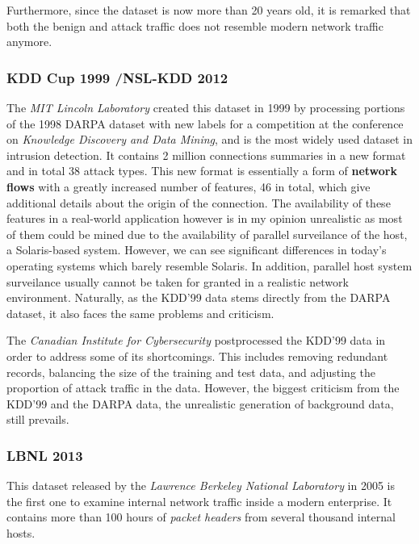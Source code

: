 \documentclass[a4paper,12pt,twoside]{report}
\begin{document}
Furthermore, since the dataset is now more than 20 years old, it is remarked that both the benign and attack traffic does not resemble modern network traffic anymore. 

\subsubsection*{KDD Cup 1999 \cite{cup1999data,cup1999dataset}/NSL-KDD 2012 \cite{tavallaee2012nsl}}

The \textit{MIT Lincoln Laboratory} created this dataset in 1999 by processing portions of the 1998 DARPA dataset with new labels for a competition at the conference on \textit{Knowledge Discovery and Data Mining}, and is the most widely used dataset in intrusion detection. It contains 2 million connections summaries in a new format and in total 38 attack types. This new format is essentially a form of \textbf{network flows} with a greatly increased number of features, 46 in total, which give additional details about the origin of the connection. The availability of these features in a real-world application however is in my opinion unrealistic as most of them could be mined due to the availability of parallel surveilance of the host, a Solaris-based system. However, we can see significant differences in today's operating systems which barely resemble Solaris. In addition, parallel host system surveilance usually cannot be taken for granted in a realistic network environment. Naturally, as the KDD'99 data stems directly from the DARPA dataset, it also faces the same problems and criticism. 

The \textit{Canadian Institute for Cybersecurity} postprocessed the KDD'99 data in order to address some of its shortcomings. This includes removing redundant records, balancing the size of the training and test data, and adjusting the proportion of attack traffic in the data. However, the biggest criticism from the KDD'99 and the DARPA data, the unrealistic generation of background data, still prevails.

\subsubsection*{LBNL 2013 \cite{pang2005first}}

This dataset released by the \textit{Lawrence Berkeley National Laboratory} in 2005 is the first one to examine internal network traffic inside a modern enterprise. It contains more than 100 hours of \textit{packet headers} from several thousand internal hosts. 
\end{document}
